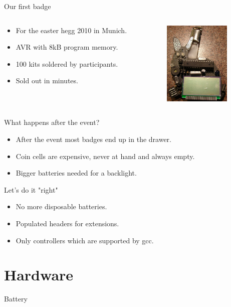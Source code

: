 \documentclass{beamer}
\begin{document}
\begin{frame}{Our first badge}
  \begin{columns}
    \begin{column}{6cm}
        \begin{itemize}
	    \item For the easter hegg 2010 in Munich.
	    \item AVR with 8kB program memory.
	    \item 100 kits soldered by participants.
	    \item Sold out in minutes.
	\end{itemize}
    \end{column}
    \begin{column}{6cm}
        \includegraphics[height=4cm]{bilder/ehaserl.jpg}\\
    \end{column}
  \end{columns}
  \end{frame}
\begin{frame}{What happens after the event?}
	\begin{itemize}
		\item After the event most badges end up in the drawer.
		\item Coin cells are expensive, never at hand and always empty.
		\item Bigger batteries needed for a backlight.
	\end{itemize}
\end{frame}
\begin{frame}{Let's do it "right"}
	\begin{itemize}
		\item No more disposable batteries.
		\item Populated headers for extensions.
		\item Only controllers which are supported by gcc.
	\end{itemize}
\end{frame}
\section{Hardware}
\begin{frame}{Battery}
\end{frame}
\end{document}
